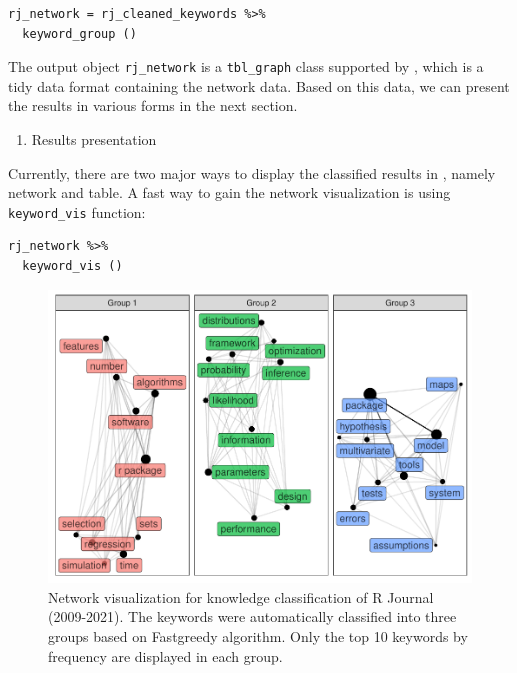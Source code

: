 \begin{verbatim}
rj_network = rj_cleaned_keywords %>% 
  keyword_group ()
\end{verbatim}

The output object \texttt{rj\_network} is a \texttt{tbl\_graph} class supported by , which is a tidy data format containing the network data. Based on this data, we can present the results in various forms in the next section.

\begin{enumerate}
\def\labelenumi{(\arabic{enumi})}
\setcounter{enumi}{3}
\tightlist
\item
  Results presentation
\end{enumerate}

Currently, there are two major ways to display the classified results in , namely network and table. A fast way to gain the network visualization is using \texttt{keyword\_vis} function:

\begin{verbatim}
rj_network %>% 
  keyword_vis ()
\end{verbatim}

\begin{figure}

{\centering \includegraphics[width=1\linewidth]{akc_files/figure-latex/fig4-1} 

}

\caption{Network visualization for knowledge classification of R Journal (2009-2021). The keywords were automatically classified into three groups based on Fastgreedy algorithm. Only the top 10 keywords by frequency are displayed in each group.}\label{fig:fig4}
\end{figure}


